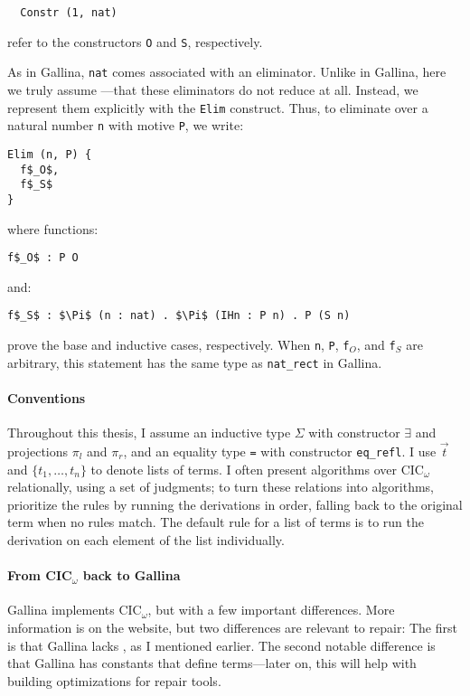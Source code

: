 \begin{lstlisting}
  Constr (1, nat)
\end{lstlisting}
refer to the constructors \lstinline{O} and \lstinline{S}, respectively.

As in Gallina, \lstinline{nat} comes associated with an eliminator.
Unlike in Gallina, here we truly assume ---that these eliminators
do not reduce at all.
Instead, we represent them explicitly with the \lstinline{Elim} construct.
Thus, to eliminate over a natural number \lstinline{n} with motive \lstinline{P},
we write: %

\begin{lstlisting}
Elim (n, P) {
  f$_O$,
  f$_S$
}
\end{lstlisting}
where functions:

\begin{lstlisting}
f$_O$ : P O
\end{lstlisting}
and:

\begin{lstlisting}
f$_S$ : $\Pi$ (n : nat) . $\Pi$ (IHn : P n) . P (S n)
\end{lstlisting}
prove the base and inductive cases, respectively.
When \lstinline{n}, \lstinline{P}, \lstinline{f}$_O$, and \lstinline{f}$_S$ are arbitrary,
this statement has the same type as \lstinline{nat_rect} in Gallina.

\paragraph{Conventions}
Throughout this thesis, I assume an inductive type $\Sigma$ with constructor $\exists$ and projections $\pi_l$ and $\pi_r$,
and an equality type \lstinline{=} with constructor \lstinline{eq_refl}.
I use $\vec{t}$ and $\{t_1, \ldots, t_n\}$ to denote lists of terms.
I often present algorithms over CIC$_{\omega}$ relationally, using a set of judgments; %
to turn these relations into algorithms, prioritize the rules by running the derivations in
order, falling back to the original term when no rules match.
The default rule for a list of terms is to run the derivation on each element of the list individually. 

\paragraph{From CIC$_{\omega}$ back to Gallina}
Gallina implements CIC$_{\omega}$, but with a few important differences.
More information is on the website, %
but two differences are relevant to repair:
The first is that Gallina lacks , as I mentioned earlier.
The second notable difference is that Gallina has constants that define terms---later on, this will help with building optimizations for repair tools.

